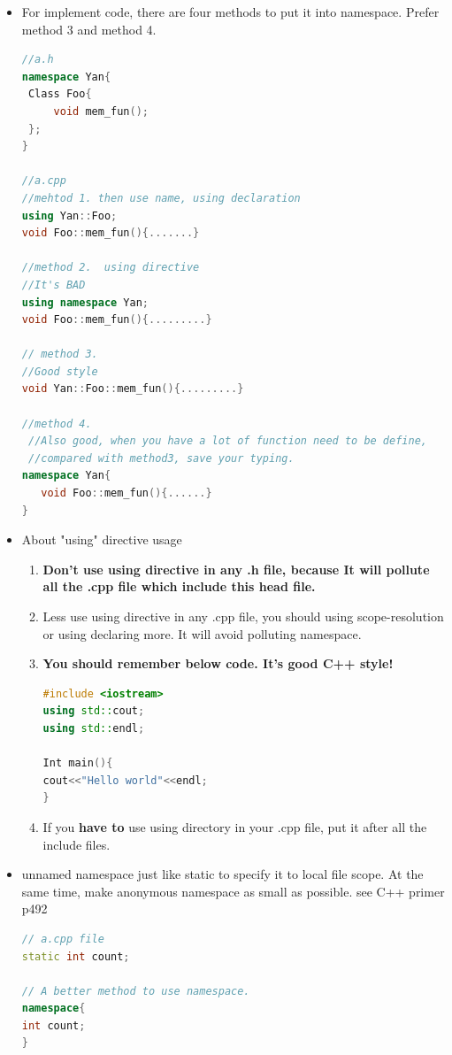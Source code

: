 \documentclass[a4paper,12pt,twoside]{book}
\newcommand{\Hilight}[1]{\makebox[0pt][l]{\color{yellow}\rule[-3pt]{#1em}{11pt}}}
\begin{document}
\begin{itemize}
\begin{lstlisting}[frame=single, language=c++, mathescape=true]
#include <iostream>
#include <string>
$\Hilight{15}$using std::string;
int main(){
    string str = "Example";
    $\Hilight{15}$using std::cout;
    cout << str;
}
\end{lstlisting}


\item For implement code, there are four methods to put it into namespace. Prefer method 3 and method 4.

\begin{lstlisting}[frame=single, language=c++]
//a.h
namespace Yan{
 Class Foo{
     void mem_fun();
 };
}

//a.cpp
//mehtod 1. then use name, using declaration
using Yan::Foo;
void Foo::mem_fun(){.......}

//method 2.  using directive
//It's BAD
using namespace Yan;
void Foo::mem_fun(){.........}

// method 3.
//Good style
void Yan::Foo::mem_fun(){.........}

//method 4.
 //Also good, when you have a lot of function need to be define,
 //compared with method3, save your typing.
namespace Yan{
   void Foo::mem_fun(){......}
}
\end{lstlisting}

\item About "using" directive usage
\begin{enumerate}
\item  \textbf{Don't use using directive in any .h file,  because It will pollute all the .cpp file which include this head file.}

\item  Less use using directive in any .cpp file, you should using scope-resolution or using declaring more. It will avoid polluting namespace.

\item \textbf{You should remember below code. It's good C++ style!} 
\begin{lstlisting}[frame=single, language=c++]
#include <iostream>
using std::cout;
using std::endl;

Int main(){
cout<<"Hello world"<<endl;
}
\end{lstlisting}

\item If you \textbf{have to} use using directory in your .cpp file, put it after all the include files.
\end{enumerate}

\item unnamed namespace just like static to specify it to local file scope. At the same time, make anonymous namespace as small as possible.  see C++ primer p492

\begin{lstlisting}[frame=single, language=c++]
// a.cpp file
static int count;

// A better method to use namespace.
namespace{
int count;
}
\end{lstlisting}

\end{itemize}
\end{document}
